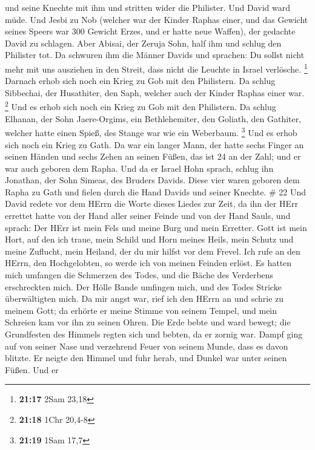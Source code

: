 und seine Knechte mit ihm und stritten wider die Philister. Und David
ward müde.  Und Jesbi zu Nob (welcher war der Kinder Raphas
einer, und das Gewicht seines Speers war 300 Gewicht Erzes, und er hatte
neue Waffen), der gedachte David zu schlagen.  Aber Abisai,
der Zeruja Sohn, half ihm und schlug den Philister tot. Da schwuren ihm
die Männer Davids und sprachen: Du sollst nicht mehr mit uns ausziehen
in den Streit, dass nicht die Leuchte in Israel verlösche. \footnote{\textbf{21:17}
  2Sam 23,18}  Darnach erhob sich noch ein Krieg zu Gob mit
den Philistern. Da schlug Sibbechai, der Husathiter, den Saph, welcher
auch der Kinder Raphas einer war. \footnote{\textbf{21:18} 1Chr 20,4-8}
 Und es erhob sich noch ein Krieg zu Gob mit den
Philistern. Da schlug Elhanan, der Sohn Jaere-Orgims, ein Bethlehemiter,
den Goliath, den Gathiter, welcher hatte einen Spieß, des Stange war wie
ein Weberbaum. \footnote{\textbf{21:19} 1Sam 17,7}  Und es
erhob sich noch ein Krieg zu Gath. Da war ein langer Mann, der hatte
sechs Finger an seinen Händen und sechs Zehen an seinen Füßen, das ist
24 an der Zahl; und er war auch geboren dem Rapha.  Und da
er Israel Hohn sprach, schlug ihn Jonathan, der Sohn Simeas, des Bruders
Davids.  Diese vier waren geboren dem Rapha zu Gath und
fielen durch die Hand Davids und seiner Knechte. \# 22  Und
David redete vor dem HErrn die Worte dieses Liedes zur Zeit, da ihn der
HErr errettet hatte von der Hand aller seiner Feinde und von der Hand
Sauls, und sprach:  Der HErr ist mein Fels und meine Burg
und mein Erretter.  Gott ist mein Hort, auf den ich traue,
mein Schild und Horn meines Heils, mein Schutz und meine Zuflucht, mein
Heiland, der du mir hilfst vor dem Frevel.  Ich rufe an den
HErrn, den Hochgelobten, so werde ich von meinen Feinden erlöst.
 Es hatten mich umfangen die Schmerzen des Todes, und die
Bäche des Verderbens erschreckten mich.  Der Hölle Bande
umfingen mich, und des Todes Stricke überwältigten mich.  Da
mir angst war, rief ich den HErrn an und schrie zu meinem Gott; da
erhörte er meine Stimme von seinem Tempel, und mein Schreien kam vor ihn
zu seinen Ohren.  Die Erde bebte und ward bewegt; die
Grundfesten des Himmels regten sich und bebten, da er zornig war.
 Dampf ging auf von seiner Nase und verzehrend Feuer von
seinem Munde, dass es davon blitzte.  Er neigte den Himmel
und fuhr herab, und Dunkel war unter seinen Füßen.  Und er
